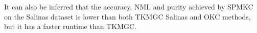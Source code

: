 \documentclass[10pt,final]{IEEEtran}
\begin{document}
It can also be inferred that the accuracy, NMI, and purity achieved by SPMKC on the Salinas dataset is lower than both TKMGC Salinas and OKC methods, but it has a faster runtime than TKMGC. 
\end{document}
